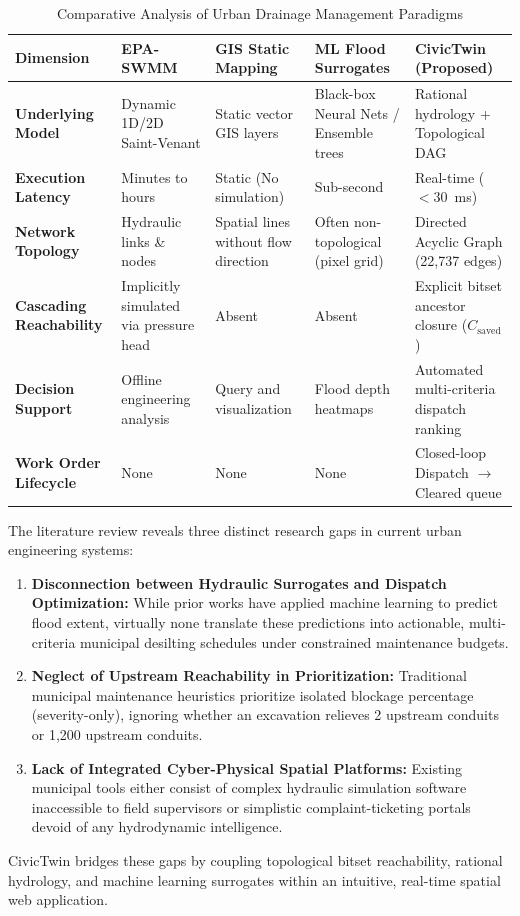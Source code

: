 \begin{table}[h!]
\centering
\caption{Comparative Analysis of Urban Drainage Management Paradigms}
\label{tab:lit_comparison}
\fontsize{9pt}{11pt}\selectfont
\begin{tabular}{|p{3.2cm}|p{2.6cm}|p{2.6cm}|p{2.8cm}|p{3.2cm}|}
\hline
\textbf{Dimension} & \textbf{EPA-SWMM} \cite{rossman2015storm} & \textbf{GIS Static Mapping} & \textbf{ML Flood Surrogates} \cite{kabir2020deep} & \textbf{CivicTwin (Proposed)} \\
\hline
\textbf{Underlying Model} & Dynamic 1D/2D Saint-Venant & Static vector GIS layers & Black-box Neural Nets / Ensemble trees & Rational hydrology + Topological DAG \\
\hline
\textbf{Execution Latency} & Minutes to hours & Static (No simulation) & Sub-second & Real-time ($< 30$~ms) \\
\hline
\textbf{Network Topology} & Hydraulic links \& nodes & Spatial lines without flow direction & Often non-topological (pixel grid) & Directed Acyclic Graph (22,737 edges) \\
\hline
\textbf{Cascading Reachability} & Implicitly simulated via pressure head & Absent & Absent & Explicit bitset ancestor closure ($C_{\text{saved}}$) \\
\hline
\textbf{Decision Support} & Offline engineering analysis & Query and visualization & Flood depth heatmaps & Automated multi-criteria dispatch ranking \\
\hline
\textbf{Work Order Lifecycle} & None & None & None & Closed-loop Dispatch $\rightarrow$ Cleared queue \\
\hline
\end{tabular}
\end{table}

The literature review reveals three distinct research gaps in current urban engineering systems:
\begin{enumerate}
    \item \textbf{Disconnection between Hydraulic Surrogates and Dispatch Optimization:} While prior works have applied machine learning to predict flood extent, virtually none translate these predictions into actionable, multi-criteria municipal desilting schedules under constrained maintenance budgets.
    \item \textbf{Neglect of Upstream Reachability in Prioritization:} Traditional municipal maintenance heuristics prioritize isolated blockage percentage (severity-only), ignoring whether an excavation relieves 2 upstream conduits or 1,200 upstream conduits.
    \item \textbf{Lack of Integrated Cyber-Physical Spatial Platforms:} Existing municipal tools either consist of complex hydraulic simulation software inaccessible to field supervisors or simplistic complaint-ticketing portals devoid of any hydrodynamic intelligence.
\end{enumerate}

CivicTwin bridges these gaps by coupling topological bitset reachability, rational hydrology, and machine learning surrogates within an intuitive, real-time spatial web application.

